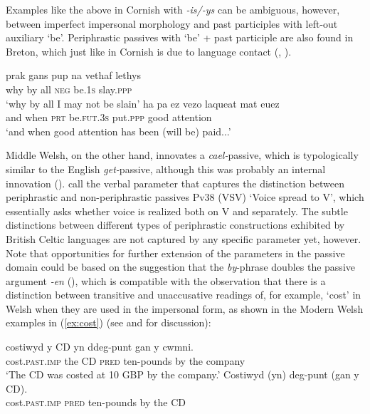 \documentclass[output=paper,colorlinks,citecolor=brown]{langscibook}
\begin{document}
\noindent Examples like the above in Cornish with \textit{-is/-ys} can be ambiguous, however, between imperfect impersonal morphology and past participles with left-out auxiliary `be'. Periphrastic passives with `be' + past participle are also found in Breton, which just like in Cornish is due to language contact (\cite[49--50]{mm:lewis_llawlyfr_1966}, \cite[125--126]{mm:leroux1957}).

\ea 
\ea
\settowidth{}
\gll prak gans pup na vethaf lethys \\
why by all \textsc{neg} be.\textsc{1s} slay.\textsc{ppp}\\ 
\glt `why by all I may not be slain' 
\ex
\gll ha pa ez vezo laqueat mat euez \\
and when \textsc{prt} be.\textsc{fut}.\textsc{3s} put.\textsc{ppp} good attention\\ 
\glt `and when good attention has been (will be) paid...'  
\z
\z

\noindent Middle Welsh, on the other hand, innovates a \textit{cael-}passive, which is typologically similar to the English \textit{get-}passive, although this was probably an internal innovation (\citealt{mm:WillisForth}). \citet{mm:bakerroberts2024} call the verbal parameter that captures the distinction between periphrastic and non-periphrastic passives Pv38 (VSV) `Voice spread to V', which essentially asks whether voice is realized both on V and separately. The subtle distinctions between different types of periphrastic constructions exhibited by British Celtic languages are not captured by any specific parameter yet, however. Note that opportunities for further extension of the parameters in the passive domain could be based on the suggestion that the \textit{by}-phrase doubles the passive argument \textit{-en} (\cite[223]{mm:baker_passive_1989}), which is compatible with the observation that there is a distinction between transitive and unaccusative readings of, for example, `cost' in Welsh when they are used in the impersonal form, as shown in the Modern Welsh examples in (\ref{ex:cost}) (see \cite[133--136]{mm:arman_welsh_2015}  and \cite[425fn5]{mm:roberts_parameter_2019} for discussion):

\ea \label{ex:cost}
\ea 
\gll costiwyd y CD yn ddeg-punt gan y cwmni.\\
cost.\textsc{past}.\textsc{imp} the CD \textsc{pred} ten-pounds by the company\\ 
\glt `The CD was costed at 10 GBP by the company.'
\ex
\gll *Costiwyd (yn) deg-punt (gan y CD).\\
cost.\textsc{past}.\textsc{imp} \textsc{pred} ten-pounds by the CD\\
\z
\z
\end{document}
